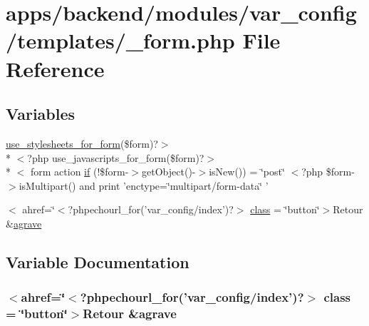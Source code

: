 \hypertarget{backend_2modules_2var__config_2templates_2__form_8php}{\section{apps/backend/modules/var\-\_\-config/templates/\-\_\-form.php File Reference}
\label{backend_2modules_2var__config_2templates_2__form_8php}
}
\subsection*{Variables}
\begin{DoxyCompactItemize}
\item 
\hyperlink{live_2modules_2user_2templates_2__form_8php_a86bc4522fdbe625b07bc4a4d6eec3df7}{use\-\_\-stylesheets\-\_\-for\-\_\-form}(\$form)?$>$\\*
$<$?php use\-\_\-javascripts\-\_\-for\-\_\-form(\$form)?$>$\\*
$<$ form action \hyperlink{backend_2modules_2var__config_2templates_2__form_8php_abd1acf0179bbb4a56e04d4fccdbc121f}{if} (!\$form-\/$>$get\-Object()-\/$>$is\-New()) = \char`\"{}post\char`\"{} $<$?php \$form-\/$>$is\-Multipart() and print 'enctype=\char`\"{}multipart/form-\/data\char`\"{} '
\item 
$<$ ahref=\char`\"{}$<$?phpechourl\-\_\-for('var\-\_\-config/index')?$>$ \hyperlink{backend_2modules_2var__config_2templates_2__form_8php_a47de8008145b54f35c6afadc610bda81}{class} = \char`\"{}button\char`\"{}$>$Retour \&\hyperlink{presse_2modules_2page_2templates_2concours_ouikos_success_8php_adcbedde811e3c81b65c252edf38caea2}{agrave}
\end{DoxyCompactItemize}


\subsection{Variable Documentation}
\hypertarget{backend_2modules_2var__config_2templates_2__form_8php_a47de8008145b54f35c6afadc610bda81}{
\subsubsection[{class}]{\setlength{\rightskip}{0pt plus 5cm}$<$ahref=\char`\"{}$<$?phpechourl\-\_\-for('var\-\_\-config/index')?$>$ class = \char`\"{}button\char`\"{}$>$Retour \&{\bf agrave}}}\label{backend_2modules_2var__config_2templates_2__form_8php_a47de8008145b54f35c6afadc610bda81}


